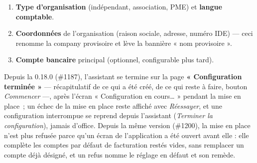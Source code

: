 \documentclass[a4paper,11pt,oneside]{article}
\begin{document}
\begin{enumerate}
    \textbf{Installation touchée par le défaut \#528} (société effacée par une réinitialisation d'une version antérieure), si elle compte \textbf{aucune ou une} société : la réinitialisation rattache à la société les utilisateurs qui désignaient la société effacée, et \textbf{révoque} les clés d'API qui la désignaient avant de les rattacher --- elles paraissent, révoquées, sur la page des clés : recréez celles qui servent. Depuis la 0.16.0, les clés du serveur MCP (\S\ref{sec:mcp-cles}) qui la désignaient sont traitées de même : \textbf{révoquées}, puis rattachées à la société. Sur une installation touchée restée \textbf{sans société}, le choix de la langue fait la même réparation. La session en cours doit alors être \textbf{rouverte} --- reconnexion, ou attendre le renouvellement de la session, au plus la durée du \textbf{jeton d'accès} (\texttt{KESH\_JWT\_EXPIRY\_MINUTES}) plus une minute ; d'ici là, certains écrans de la société répondent par une erreur, d'autres s'affichent vides. Une installation qui porte \textbf{deux sociétés ou plus} --- réelles ou provisoires, ces dernières venant du défaut \#542 (un redémarrage avant la création de l'administrateur en ajoutait une) --- n'était \textbf{pas} réinitialisable par ce bouton : il y répondait par une erreur interne et n'effaçait rien. Depuis la 0.13.0, une installation déjà touchée par \#528 ou \#542 est \textbf{réparée au premier démarrage} de la nouvelle version --- voir \S\ref{sec:reparation-installation} et, si la réparation échoue, la section \emph{Dépannage}.
    \item \textbf{Type d'organisation} (indépendant, association, PME) et \textbf{langue comptable}.
    \item \textbf{Coordonnées} de l'organisation (raison sociale, adresse, numéro IDE) — ceci renomme la company provisoire et lève la bannière « nom provisoire ».
    \item \textbf{Compte bancaire} principal (optionnel, configurable plus tard).
\end{enumerate}

Depuis la 0.18.0 (\#1187), l'assistant se termine sur la page \textbf{« Configuration terminée »} --- récapitulatif de ce qui a été créé, de ce qui reste à faire, bouton \emph{Commencer} ---, après l'écran « Configuration en cours… » pendant la mise en place~; un échec de la mise en place reste affiché avec \emph{Réessayer}, et une configuration interrompue se reprend depuis l'assistant (\emph{Terminer la configuration}), jamais d'office. Depuis la même version (\#1200), la mise en place n'est plus refusée parce qu'un écran de l'application a été ouvert avant elle : elle complète les comptes par défaut de facturation restés vides, sans remplacer un compte déjà désigné, et un refus nomme le réglage en défaut et son remède.
\end{document}
